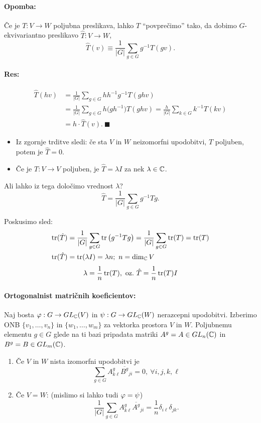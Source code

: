 \paragraph{Opomba:}
\v Ce je $T : V \to W$ poljubna preslikava, lahko $T$ "`povpre\v cimo"' tako, da dobimo $G$-ekvivariantno preslikavo $\hat{T} : V \to W$,
\[
	\hat{T} (v) \equiv \frac{1}{|G|}\sum_{g \in G} g^{-1} T(gv).
\]
\paragraph{Res:}
\begin{align*}
	\hat{T} (hv) &= \frac{1}{|G|}\sum_{g\in G}hh^{-1}g^{-1}T(ghv) \\
	&= \frac{1}{|G|}\sum_{g \in G} h \big(gh^{-1}\big)T(ghv) = \frac{h}{|G|} \sum_{k \in G} k^{-1} T(kv) \\
	&= h \cdot \hat{T}(v).\ \blacksquare
\end{align*}

\begin{itemize}
	\item{Iz zgornje trditve sledi: \v ce sta $V$ in $W$ neizomorfni upodobitvi, $T$ poljuben, potem je $\hat{T} = 0$.}
	\item{\v Ce je $T : V \to V$ poljuben, je $\hat{T} = \lambda I$ za nek $\lambda \in \mathbb{C}$.}
\end{itemize}

\ni Ali lahko iz tega dolo\v cimo vrednost $\lambda$?
\[
	\hat{T} = \frac{1}{|G|}\sum_{g \in G} g^{-1} T g.
\]

\ni Poskusimo sled:
\begin{align*}
	\operatorname{tr} (\hat{T}) &= \frac{1}{|G|}\sum_{g \in G} \operatorname{tr}\big(g^{-1}Tg\big) = \frac{1}{|G|}\sum_{g \in G} \operatorname{tr}(T) = \operatorname{tr}(T) \\
	\operatorname{tr} (\hat{T}) &= \operatorname{tr}(\lambda I) = \lambda n;\ n = \dim_{\mathbb{C}} V
\end{align*}
\[
	\lambda = \frac{1}{n}\operatorname{tr}(T),\ \text{oz.}\ \hat{T} = \frac{1}{n} \operatorname{tr}(T) I
\]

\begin{posledica}
	\paragraph{Ortogonalnist matri\v cnih koeficientov:} Naj bosta $\varphi : G \to GL_{\mathbb{C}} (V)$ in $\psi : G \to GL_{\mathbb{C}}(W)$ nerazcepni
	upodobitvi. Izberimo ONB $\{v_1, \ldots, v_n\}$ in $\{w_1, \ldots, w_m\}$ za vektorka prostora $V$ in $W$. Poljubnemu elementu
	$g \in G$ glede na ti bazi pripadata matriki $A^g = A \in GL_n(\mathbb{C})$ in $B^g = B \in GL_m(\mathbb{C})$.
	\begin{enumerate}
		\item{\v Ce $V$ in $W$ nista izomorfni upodobitvi je
			\[
				\sum_{g \in G}A^g_{k\ell} \overline{B^g}_{ji} = 0,\ \forall i,j,k,\ell
			\]}
		\item{\v Ce $V = W$: (mislimo si lahko tudi $\varphi = \psi$)
			\[
				\frac{1}{|G|}\sum_{g \in G}A^g_{k\ell}\overline{A^g}_{ji} = \frac{1}{n}\delta_{i\ell}\delta_{jk}.
			\]}
	\end{enumerate}
\end{posledica}

